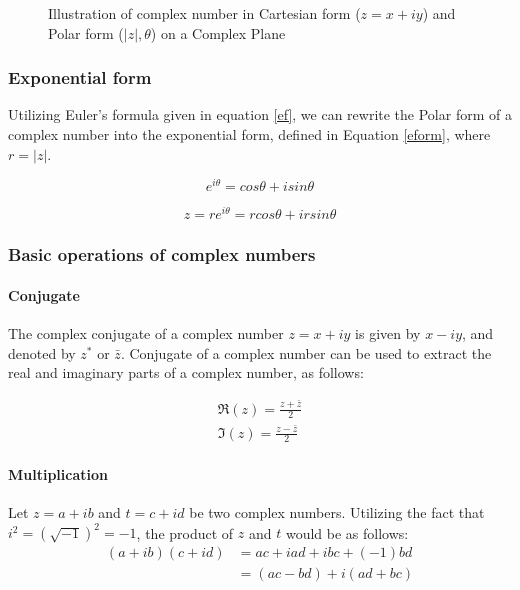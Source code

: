 \begin{figure}[htb]
	\centering
	\epsfxsize=5cm
	{}
	\caption{Illustration of complex number in Cartesian form ($z=x+iy$) and Polar form ($|z|,\theta$) on a Complex Plane}
	\label{fig:complexrep}
\end{figure}

\subsubsection{Exponential form}
Utilizing Euler's formula given in equation \ref{ef}, we can rewrite the Polar form of a complex number into the exponential form, defined in Equation \ref{eform}, where $r = |z|$.


\begin{equation}\label{ef}
e^{i\theta} = cos\theta+isin\theta
\end{equation}

\begin{equation}\label{eform}
 z = re^{i\theta} = rcos\theta+irsin\theta
\end{equation}




\subsubsection{Basic operations of complex numbers }
\paragraph{Conjugate}
The complex conjugate of a complex number $z=x+iy$ is given by $x-iy$, and denoted by $z^{*}$ or $\bar{z}$. Conjugate of a complex number can be used to extract the real and imaginary parts of a complex number, as follows:

\begin{equation}
\begin{aligned}
\Re(z)= \frac{z+\bar{z}}{2}\\
\Im(z)= \frac{z-\bar{z}}{2}
\end{aligned}
\end{equation}

\paragraph{Multiplication}
Let $z = a+ib$ and $t=c+id$ be two complex numbers. Utilizing the fact that $i^{2}=(\sqrt{-1})^2=-1$, the product of $z$ and $t$ would be as follows:
\begin{equation}
\begin{aligned}
(a+ib)(c+id)  &= ac+iad+ibc+(-1)bd\\
&= (ac-bd)+i(ad+bc)
\end{aligned}
\end{equation}

